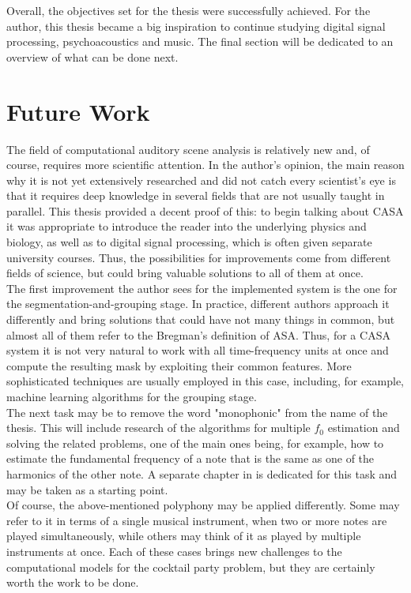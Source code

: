 Overall, the objectives set for the thesis were successfully achieved. For the author, this thesis became a big inspiration to continue studying digital signal processing, psychoacoustics and music. The final section will be dedicated to an overview of what can be done next.

\section{Future Work}

The field of computational auditory scene analysis is relatively new and, of course, requires more scientific attention. In the author's opinion, the main reason why it is not yet extensively researched and did not catch every scientist's eye is that it requires deep knowledge in several fields that are not usually taught in parallel. This thesis provided a decent proof of this: to begin talking about CASA it was appropriate to introduce the reader into the underlying physics and biology, as well as to digital signal processing, which is often given separate university courses. Thus, the possibilities for improvements come from different fields of science, but could bring valuable solutions to all of them at once.\\

The first improvement the author sees for the implemented system is the one for the segmen\-tation-and-grouping stage. In practice, different authors approach it differently and bring solutions that could have not many things in common, but almost all of them refer to the Bregman's definition of ASA. Thus, for a CASA system it is not very natural to work with all time-frequency units at once and compute the resulting mask by exploiting their common features. More sophisticated techniques are usually employed in this case, including, for example, machine learning algorithms for the grouping stage.\\

The next task may be to remove the word "monophonic" from the name of the thesis. This will include research of the algorithms for multiple $f_0$ estimation and solving the related problems, one of the main ones being, for example, how to estimate the fundamental frequency of a note that is the same as one of the harmonics of the other note. A separate chapter in \cite{Wang2006} is dedicated for this task and may be taken as a starting point.\\

Of course, the above-mentioned polyphony may be applied differently. Some may refer to it in terms of a single musical instrument, when two or more notes are played simultaneously, while others may think of it as played by multiple instruments at once. Each of these cases brings new challenges to the computational models for the cocktail party problem, but they are certainly worth the work to be done.\\

